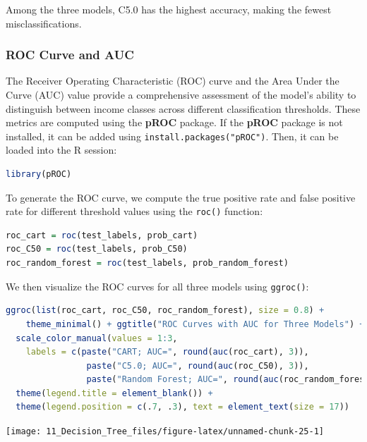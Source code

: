 \documentclass[
  11pt,
]{book}
\newcommand{\passthrough}[1]{#1}
\theoremstyle{definition}
\theoremstyle{definition}
\theoremstyle{definition}
\theoremstyle{definition}
\theoremstyle{remark}
\begin{document}
Among the three models, C5.0 has the highest accuracy, making the fewest misclassifications.

\subsubsection*{ROC Curve and AUC}\label{roc-curve-and-auc-2}


The Receiver Operating Characteristic (ROC) curve and the Area Under the Curve (AUC) value provide a comprehensive assessment of the model's ability to distinguish between income classes across different classification thresholds. These metrics are computed using the \textbf{pROC} package. If the \textbf{pROC} package is not installed, it can be added using \passthrough{\lstinline!install.packages("pROC")!}. Then, it can be loaded into the R session:

\begin{lstlisting}[language=R]
library(pROC)
\end{lstlisting}

To generate the ROC curve, we compute the true positive rate and false positive rate for different threshold values using the \passthrough{\lstinline!roc()!} function:

\begin{lstlisting}[language=R]
roc_cart = roc(test_labels, prob_cart)
roc_C50 = roc(test_labels, prob_C50)
roc_random_forest = roc(test_labels, prob_random_forest)
\end{lstlisting}

We then visualize the ROC curves for all three models using \passthrough{\lstinline!ggroc()!}:

\begin{lstlisting}[language=R]
ggroc(list(roc_cart, roc_C50, roc_random_forest), size = 0.8) + 
    theme_minimal() + ggtitle("ROC Curves with AUC for Three Models") +
  scale_color_manual(values = 1:3, 
    labels = c(paste("CART; AUC=", round(auc(roc_cart), 3)), 
                paste("C5.0; AUC=", round(auc(roc_C50), 3)), 
                paste("Random Forest; AUC=", round(auc(roc_random_forest), 3)))) +
  theme(legend.title = element_blank()) +
  theme(legend.position = c(.7, .3), text = element_text(size = 17))
\end{lstlisting}

\begin{center}\texttt{[image: 11\_Decision\_Tree\_files/figure-latex/unnamed-chunk-25-1]} \end{center}
\end{document}
